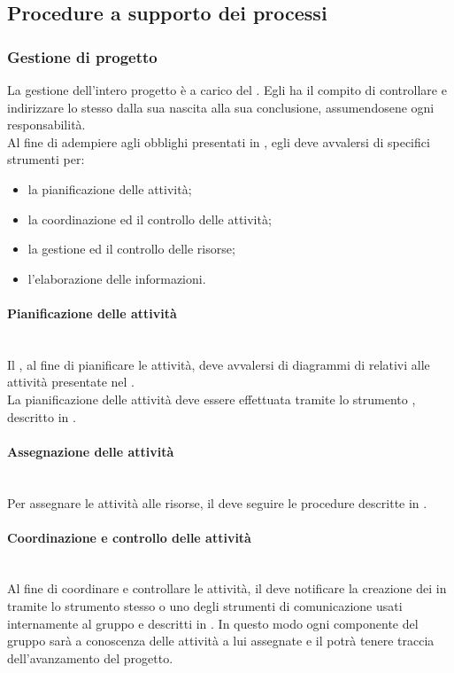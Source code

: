 \subsection{Procedure a supporto dei processi}

\subsubsection{Gestione di progetto}
La gestione dell'intero progetto è a carico del \Responsabile. Egli ha il compito di controllare e indirizzare lo stesso dalla sua nascita alla sua conclusione, assumendosene ogni responsabilità.\\
Al fine di adempiere agli obblighi presentati in , egli deve avvalersi di specifici strumenti per:
\begin{itemize}
	\item la pianificazione delle attività;
	\item la coordinazione ed il controllo delle attività;
	\item la gestione ed il controllo delle risorse;
	\item l'elaborazione delle informazioni.
\end{itemize}

\paragraph{Pianificazione delle attività}\mbox{}\\
Il \Responsabile, al fine di pianificare le attività, deve avvalersi di diagrammi di  relativi alle attività presentate nel \PianoDiProgetto.\\
La pianificazione delle attività deve essere effettuata tramite lo strumento , descritto in .

\paragraph{Assegnazione delle attività}\mbox{}\\
Per assegnare le attività alle risorse, il \Responsabile{} deve seguire le procedure descritte in .

\paragraph{Coordinazione e controllo delle attività}\mbox{}\\
Al fine di coordinare e controllare le attività, il \Responsabile{} deve notificare la creazione dei  in  tramite lo strumento stesso o uno degli strumenti di comunicazione usati internamente al gruppo e descritti in . In questo modo ogni componente del gruppo sarà a conoscenza delle attività a lui assegnate e il \Responsabile{} potrà tenere traccia dell'avanzamento del progetto.

